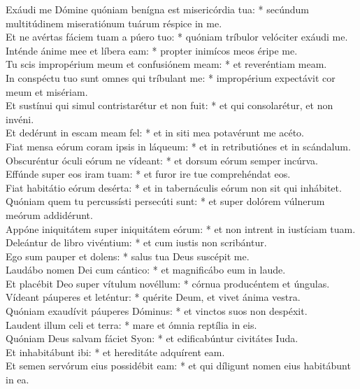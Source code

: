 {	Exáudi me Dómine quóniam benígna est misericórdia tua: * secúndum multitúdinem miseratiónum tuárum réspice in me. \\
	Et ne avértas fáciem tuam a púero tuo: * quóniam tríbulor velóciter exáudi me. \\
	Inténde ánime mee et líbera eam: * propter inimícos meos éripe me. \\
	Tu scis impropérium meum et confusiónem meam: * et reveréntiam meam. \\
	In conspéctu tuo sunt omnes qui tríbulant me: * impropérium expectávit cor meum et misériam. \\
	Et sustínui qui simul contristarétur et non fuit: * et qui consolarétur, et non invéni. \\
	Et dedérunt in escam meam fel: * et in siti mea potavérunt me acéto. \\
	Fiat mensa eórum coram ipsis in láqueum: * et in retributiónes et in scándalum. \\
	Obscuréntur óculi eórum ne vídeant: * et dorsum eórum semper incúrva. \\
	Effúnde super eos iram tuam: * et furor ire tue comprehéndat eos. \\
	Fiat habitátio eórum desérta: * et in tabernáculis eórum non sit qui inhábitet. \\
	Quóniam quem tu percussísti persecúti sunt: * et super dolórem vúlnerum meórum addidérunt. \\
	Appóne iniquitátem super iniquitátem eórum: * et non intrent in iustíciam tuam. \\
	Deleántur de libro vivéntium: * et cum iustis non scribántur. \\
	Ego sum pauper et dolens: * salus tua Deus suscépit me. \\
	Laudábo nomen Dei cum cántico: * et magnificábo eum in laude. \\
	Et placébit Deo super vítulum novéllum: * córnua producéntem et úngulas. \\
	Vídeant páuperes et leténtur: * quérite Deum, et vivet ánima vestra. \\
	Quóniam exaudívit páuperes Dóminus: * et vinctos suos non despéxit. \\
	Laudent illum celi et terra: * mare et ómnia reptília in eis. \\
	Quóniam Deus salvam fáciet Syon: * et edificabúntur civitátes Iuda. \\
	Et inhabitábunt ibi: * et hereditáte adquírent eam. \\
	Et semen servórum eius possidébit eam: * et qui díligunt nomen eius habitábunt in ea.
}

